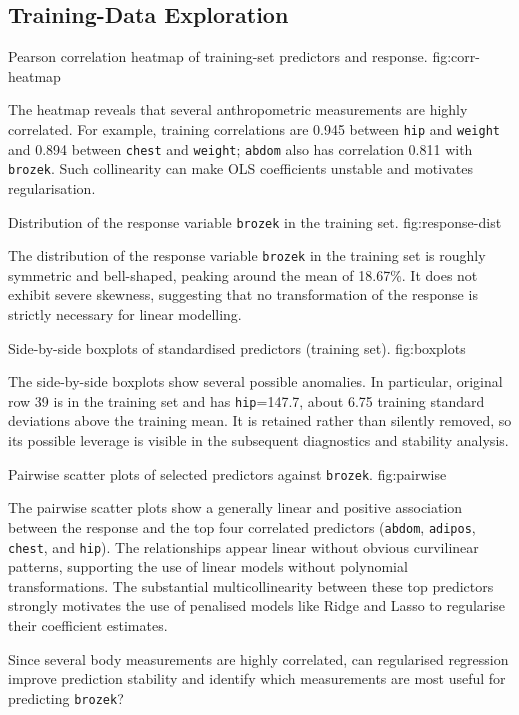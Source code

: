\subsection{Training-Data Exploration}
\label{sec:eda}

%
    {Pearson correlation heatmap of training-set predictors and response.}%
    {fig:corr-heatmap}

The heatmap reveals that several anthropometric measurements are highly
correlated.  For example, training correlations are 0.945 between \texttt{hip}
and \texttt{weight} and 0.894 between \texttt{chest} and \texttt{weight};
\texttt{abdom} also has correlation 0.811 with \texttt{brozek}.  Such
collinearity can make OLS coefficients unstable and motivates regularisation.

%
    {Distribution of the response variable \texttt{brozek} in the training set.}%
    {fig:response-dist}

The distribution of the response variable \texttt{brozek} in the training set is roughly symmetric and bell-shaped, peaking around the mean of 18.67\%. It does not exhibit severe skewness, suggesting that no transformation of the response is strictly necessary for linear modelling.

%
    {Side-by-side boxplots of standardised predictors (training set).}%
    {fig:boxplots}

The side-by-side boxplots show several possible anomalies.  In particular,
original row 39 is in the training set and has \texttt{hip}=147.7, about 6.75
training standard deviations above the training mean.  It is retained rather
than silently removed, so its possible leverage is visible in the subsequent
diagnostics and stability analysis.

%
    {Pairwise scatter plots of selected predictors against \texttt{brozek}.}%
    {fig:pairwise}

The pairwise scatter plots show a generally linear and positive association between the response and the top four correlated predictors (\texttt{abdom}, \texttt{adipos}, \texttt{chest}, and \texttt{hip}). The relationships appear linear without obvious curvilinear patterns, supporting the use of linear models without polynomial transformations. The substantial multicollinearity between these top predictors strongly motivates the use of penalised models like Ridge and Lasso to regularise their coefficient estimates.

Since several body measurements are highly correlated, can regularised
regression improve prediction stability and identify which measurements are
most useful for predicting \texttt{brozek}?
